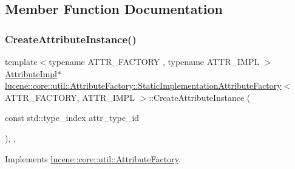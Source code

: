 \subsection{Member Function Documentation}
\mbox{\label{classlucene_1_1core_1_1util_1_1AttributeFactory_1_1StaticImplementationAttributeFactory_a06466469f2cf37e0ef599e617d415c6a}} 
\subsubsection{\texorpdfstring{Create\+Attribute\+Instance()}{CreateAttributeInstance()}}
{\footnotesize\ttfamily template$<$typename A\+T\+T\+R\+\_\+\+F\+A\+C\+T\+O\+RY , typename A\+T\+T\+R\+\_\+\+I\+M\+PL $>$ \\
\mbox{\hyperlink{classlucene_1_1core_1_1util_1_1AttributeImpl}{Attribute\+Impl}}$\ast$ \mbox{\hyperlink{classlucene_1_1core_1_1util_1_1AttributeFactory_1_1StaticImplementationAttributeFactory}{lucene\+::core\+::util\+::\+Attribute\+Factory\+::\+Static\+Implementation\+Attribute\+Factory}}$<$ A\+T\+T\+R\+\_\+\+F\+A\+C\+T\+O\+RY, A\+T\+T\+R\+\_\+\+I\+M\+PL $>$\+::Create\+Attribute\+Instance (\begin{DoxyParamCaption}\item[{const std\+::type\+\_\+index}]{attr\+\_\+type\+\_\+id }\end{DoxyParamCaption})\hspace{0.3cm}{\ttfamily [inline]}, {\ttfamily [override]}, {\ttfamily [virtual]}}



Implements \mbox{\hyperlink{classlucene_1_1core_1_1util_1_1AttributeFactory_a88ccb9965ed78099379eaf9b1256abf3}{lucene\+::core\+::util\+::\+Attribute\+Factory}}.



